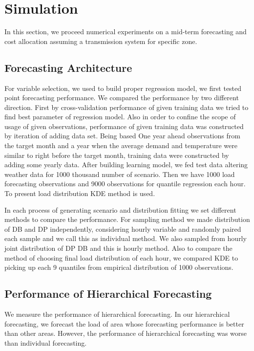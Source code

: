 \documentclass[journal]{IEEEtran} %
\begin{document}
\section{Simulation}
In this section, we proceed numerical experiments on a mid-term forecasting and cost allocation assuming a transmission system for specific zone.

\subsection{Forecasting Architecture}
 For variable selection, we used to build proper regression model, we first tested point forecasting performance. We compared the performance by two different direction. First by cross-validation performance of given training data we tried to find best parameter of regression model. Also in order to confine the scope of usage of given observations, performance of given training data was constructed by iteration of adding data set.  Being based One year ahead observations from the target month and a year when the average demand and temperature were similar to right before the target month, training data were constructed by adding some yearly data.
After building learning model, we fed test data altering weather data for 1000 thousand number of scenario. Then we have 1000 load forecasting observations and 9000 observations for quantile regression each hour. To present load distribution KDE method is used. %

In each process of generating scenario and distribution fitting we set different methods to compare the performance. For sampling method we made distribution of DB and DP independently, considering hourly variable and randomly paired each sample and we call this as individual method. We also sampled from hourly joint distribution of DP DB and this is hourly method. Also to compare the method of choosing final load distribution of each hour, we compared KDE to picking up each 9 quantiles from empirical distribution of 1000 observations. 



\subsection{Performance of Hierarchical  Forecasting}



We measure the performance of hierarchical forecasting. In our hierarchical forecasting, we forecast the load of area whose forecasting performance is better than other areas.
However, the performance of hierarchical forecasting was worse than individual forecasting.
\end{document}
